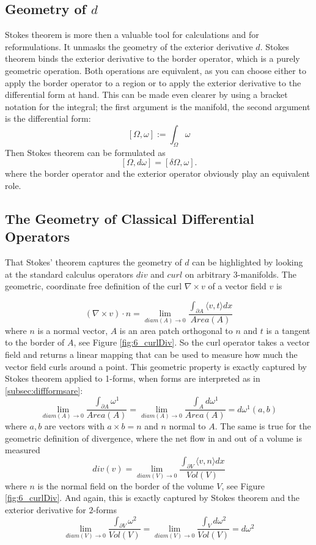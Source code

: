 \subsection{Geometry of $d$}

Stokes theorem is more then a  valuable tool for calculations and for reformulations. It unmasks the geometry of the exterior derivative $d$. Stokes theorem binds the exterior derivative to the border operator, which is a purely geometric operation. Both operations are equivalent, as you can choose either to apply the border operator to a region or to apply the exterior derivative to the differential form at hand.
This can be made even clearer by using a bracket notation for the integral; the first argument is the manifold, the second argument is the differential form:
\[[\Omega, \omega] := \int_{\Omega} \omega\]
Then Stokes theorem can be formulated as
\[[\Omega, d\omega] = [\delta \Omega, \omega].\]
where the border operator and the exterior operator obviously play an equivalent role.

\subsection{The Geometry of Classical Differential Operators}
\label{subsec:geometryCDO}
That Stokes' theorem captures the geometry of $d$ can be highlighted by looking at the standard calculus operators $div$ and $curl$ on arbitrary 3-manifolds.  The geometric, coordinate free definition of the curl $\nabla \times v$ of a vector field $v$ is 

\[(\nabla \times v) \cdot n = \lim_{diam(A)\rightarrow 0 } \frac{\int_{\partial A} \langle v , t \rangle dx}{Area(A)} \]
where $n$ is a normal vector, $A$ is an area patch orthogonal to $n$ and $t$ is a tangent to the border of $A$, see Figure \ref{fig:6_curlDiv}. So the curl operator takes a vector field and returns a linear mapping that can be used to measure how much the vector field curls around a point. This geometric property is exactly captured by Stokes theorem applied to 1-forms, when forms are interpreted as in \ref{subsec:diffformsare}:
\[\lim_{diam(A)\rightarrow 0 }\frac{\int_{\partial A} \omega^1}{Area(A)} = \lim_{diam(A)\rightarrow 0 }\frac{\int_{A} d \omega^1}{Area(A)} = d \omega^1 (a,b)\]
where $a,b$ are vectors with $a\times b = n$ and $n$ normal to $A$.
The same is true for the geometric definition of divergence, where the net flow in and out of a volume is measured
\[div(v) = \lim_{diam(V)\rightarrow 0 } \frac{\int_{\partial V} \langle v , n \rangle dx}{Vol(V)}\]
where $n$ is the normal field on the border of the volume $V$, see Figure \ref{fig:6_curlDiv}. And again, this is exactly captured by Stokes theorem and the exterior derivative for $2$-forms
\[\lim_{diam(V)\rightarrow 0 }\frac{\int_{\partial V} \omega^2}{Vol(V)} = \lim_{diam(V)\rightarrow 0 }\frac{\int_{V} d \omega^2}{Vol(V)} = d \omega^2\]

